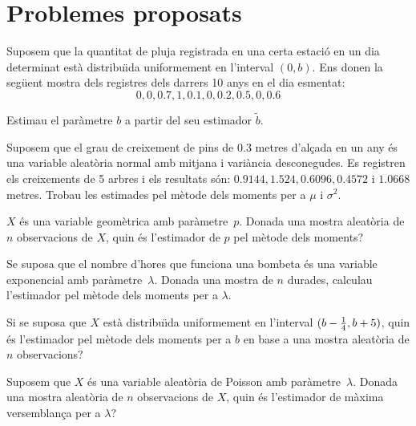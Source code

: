 \section{Problemes proposats}

\begin{prob}
{Suposem que la quantitat de pluja registrada en una certa estaci\'o
 en
un dia determinat est\`a distribu\"{\i}da uniformement en l'interval $(0,b)$. Ens
donen la seg\"uent mostra dels registres dels darrers 10 anys en el dia
esmentat: $$0,0,0.7,1,0.1,0,0.2,0.5,0,0.6$$

Estimau el par\`ametre $b$ a partir del seu estimador
 $\tilde b$.}
\end{prob}

\begin{prob}
{Suposem que el grau de creixement de pins de $0.3$ metres d'al\c{c}ada
en un any \'es una variable aleat\`oria normal amb mitjana i vari\`ancia
desconegudes. Es registren els creixements de 5 arbres i els 
resultats s\'on: $0.9144,1.524,0.6096,0.4572$ i $1.0668$ metres. 
Trobau les estimades pel m\`etode dels moments per a $\mu$ i $\sigma^2$.}
\end{prob}

\begin{prob}
{$X$ \'es una variable geom\`etrica 
amb par\`ametre~$p$.
 Donada una mostra
aleat\`oria de $n$ observacions de $X$, 
quin \'es l'estimador de $p$ pel m\`etode dels moments?}
\end{prob}

\begin{prob}
{Se suposa que el nombre d'hores que funciona una bombeta \'es una
va\-ria\-ble exponencial amb par\`ametre~$\lambda$. 
Donada una mostra de $n$
durades, calculau l'estimador pel m\`etode dels moments per a $\lambda$.}
\end{prob}

\begin{prob}
{Si se suposa que $X$ est\`a distribu\"{\i}da uniformement en l'interval
\hbox{$(b-{1\over 4},b+5)$,} quin \'es l'estimador pel m\`etode dels moments
per a $b$ en base a una mostra aleat\`oria de $n$ observacions?}
\end{prob}

\begin{prob}
{Suposem que $X$ \'es una variable aleat\`oria de Poisson
 amb par\`ametre~$\lambda$. 
Donada una mostra aleat\`oria de $n$ observacions de $X$, 
quin \'es l'estimador de m\`axima versemblan\c{c}a per a $\lambda$?}

\end{prob}

